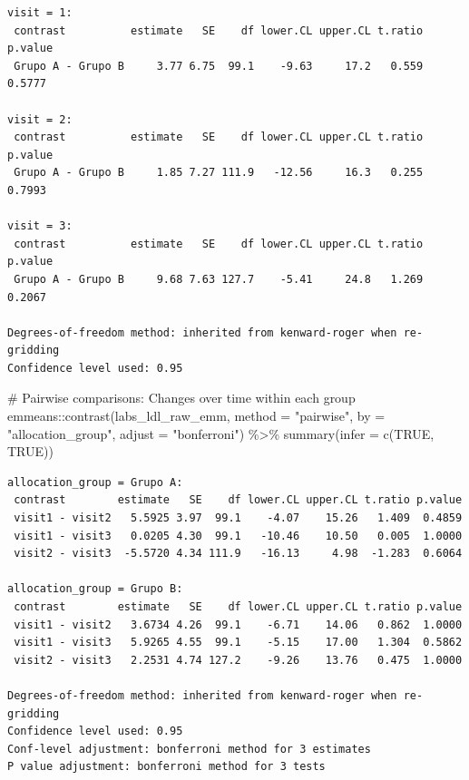 \documentclass[
  letterpaper,
  DIV=11,
  numbers=noendperiod]{scrartcl}
\newenvironment{Shaded}{\begin{snugshade}}{\end{snugshade}}
\newcommand{\AttributeTok}[1]{\textcolor[rgb]{0.40,0.45,0.13}{#1}}
\newcommand{\CommentTok}[1]{\textcolor[rgb]{0.37,0.37,0.37}{#1}}
\newcommand{\ConstantTok}[1]{\textcolor[rgb]{0.56,0.35,0.01}{#1}}
\newcommand{\FunctionTok}[1]{\textcolor[rgb]{0.28,0.35,0.67}{#1}}
\newcommand{\NormalTok}[1]{\textcolor[rgb]{0.00,0.23,0.31}{#1}}
\newcommand{\SpecialCharTok}[1]{\textcolor[rgb]{0.37,0.37,0.37}{#1}}
\newcommand{\StringTok}[1]{\textcolor[rgb]{0.13,0.47,0.30}{#1}}
\begin{document}
\begin{verbatim}
visit = 1:
 contrast          estimate   SE    df lower.CL upper.CL t.ratio p.value
 Grupo A - Grupo B     3.77 6.75  99.1    -9.63     17.2   0.559  0.5777

visit = 2:
 contrast          estimate   SE    df lower.CL upper.CL t.ratio p.value
 Grupo A - Grupo B     1.85 7.27 111.9   -12.56     16.3   0.255  0.7993

visit = 3:
 contrast          estimate   SE    df lower.CL upper.CL t.ratio p.value
 Grupo A - Grupo B     9.68 7.63 127.7    -5.41     24.8   1.269  0.2067

Degrees-of-freedom method: inherited from kenward-roger when re-gridding 
Confidence level used: 0.95 
\end{verbatim}

\begin{Shaded}
\begin{Highlighting}[]
\CommentTok{\# Pairwise comparisons: Changes over time within each group}
\NormalTok{emmeans}\SpecialCharTok{::}\FunctionTok{contrast}\NormalTok{(labs\_ldl\_raw\_emm, }\AttributeTok{method =} \StringTok{"pairwise"}\NormalTok{, }\AttributeTok{by =} \StringTok{"allocation\_group"}\NormalTok{, }\AttributeTok{adjust =} \StringTok{"bonferroni"}\NormalTok{) }\SpecialCharTok{\%\textgreater{}\%} \FunctionTok{summary}\NormalTok{(}\AttributeTok{infer =} \FunctionTok{c}\NormalTok{(}\ConstantTok{TRUE}\NormalTok{, }\ConstantTok{TRUE}\NormalTok{))}
\end{Highlighting}
\end{Shaded}

\begin{verbatim}
allocation_group = Grupo A:
 contrast        estimate   SE    df lower.CL upper.CL t.ratio p.value
 visit1 - visit2   5.5925 3.97  99.1    -4.07    15.26   1.409  0.4859
 visit1 - visit3   0.0205 4.30  99.1   -10.46    10.50   0.005  1.0000
 visit2 - visit3  -5.5720 4.34 111.9   -16.13     4.98  -1.283  0.6064

allocation_group = Grupo B:
 contrast        estimate   SE    df lower.CL upper.CL t.ratio p.value
 visit1 - visit2   3.6734 4.26  99.1    -6.71    14.06   0.862  1.0000
 visit1 - visit3   5.9265 4.55  99.1    -5.15    17.00   1.304  0.5862
 visit2 - visit3   2.2531 4.74 127.2    -9.26    13.76   0.475  1.0000

Degrees-of-freedom method: inherited from kenward-roger when re-gridding 
Confidence level used: 0.95 
Conf-level adjustment: bonferroni method for 3 estimates 
P value adjustment: bonferroni method for 3 tests 
\end{verbatim}
\end{document}
